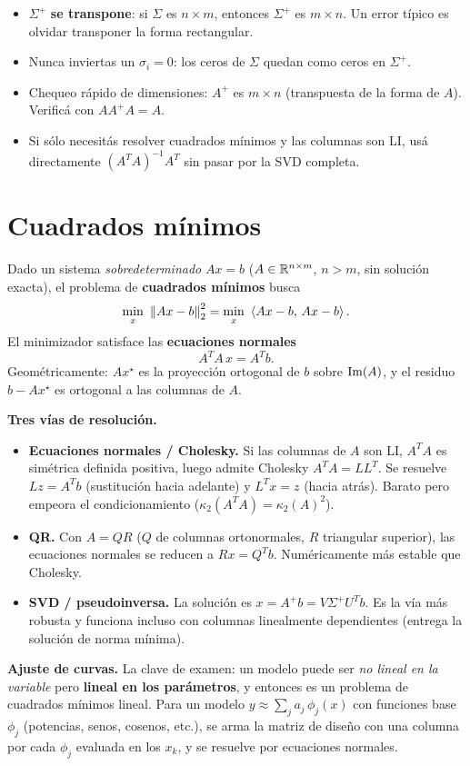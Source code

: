 \begin{truco}
\begin{itemize}
\item $\Sigma^{+}$ \textbf{se transpone}: si $\Sigma$ es $n\times m$, entonces $\Sigma^{+}$ es $m\times n$. Un error típico es olvidar transponer la forma rectangular.
\item Nunca inviertas un $\sigma_i=0$: los ceros de $\Sigma$ quedan como ceros en $\Sigma^{+}$.
\item Chequeo rápido de dimensiones: $A^{+}$ es $m\times n$ (transpuesta de la forma de $A$). Verificá con $AA^{+}A=A$.
\item Si sólo necesitás resolver cuadrados mínimos y las columnas son LI, usá directamente $(A^TA)^{-1}A^T$ sin pasar por la SVD completa.
\end{itemize}
\end{truco}


\section{Cuadrados mínimos}

\begin{teoria}
Dado un sistema \emph{sobredeterminado} $Ax=b$ ($A\in\mathbb{R}^{n\times m}$, $n>m$, sin solución exacta), el problema de \textbf{cuadrados mínimos} busca
\[
\min_{x}\ \norm{Ax-b}_2^2 = \min_x\ \inner{Ax-b}{Ax-b}.
\]
El minimizador satisface las \textbf{ecuaciones normales}
\[
A^TA\,x = A^Tb .
\]
Geométricamente: $Ax^\star$ es la proyección ortogonal de $b$ sobre $\operatorname{Im}(A)$, y el residuo $b-Ax^\star$ es ortogonal a las columnas de $A$.

\medskip
\textbf{Tres vías de resolución.}
\begin{itemize}
\item \textbf{Ecuaciones normales / Cholesky.} Si las columnas de $A$ son LI, $A^TA$ es simétrica definida positiva, luego admite Cholesky $A^TA=LL^T$. Se resuelve $Lz=A^Tb$ (sustitución hacia adelante) y $L^Tx=z$ (hacia atrás). Barato pero empeora el condicionamiento ($\kappa_2(A^TA)=\kappa_2(A)^2$).
\item \textbf{QR.} Con $A=QR$ ($Q$ de columnas ortonormales, $R$ triangular superior), las ecuaciones normales se reducen a $Rx=Q^Tb$. Numéricamente más estable que Cholesky.
\item \textbf{SVD / pseudoinversa.} La solución es $x=A^{+}b=V\Sigma^{+}U^Tb$. Es la vía más robusta y funciona incluso con columnas linealmente dependientes (entrega la solución de norma mínima).
\end{itemize}

\textbf{Ajuste de curvas.} La clave de examen: un modelo puede ser \emph{no lineal en la variable} pero \textbf{lineal en los parámetros}, y entonces es un problema de cuadrados mínimos lineal. Para un modelo $y\approx\sum_j a_j\,\phi_j(x)$ con funciones base $\phi_j$ (potencias, senos, cosenos, etc.), se arma la matriz de diseño con una columna por cada $\phi_j$ evaluada en los $x_k$, y se resuelve por ecuaciones normales.
\end{teoria}

